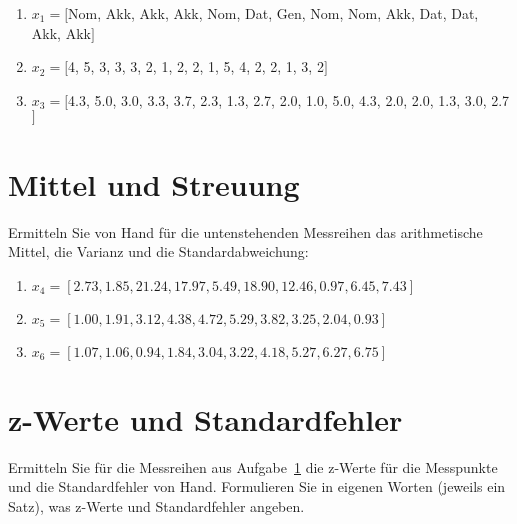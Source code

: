 \begin{enumerate}
  \item $x_1=[$Nom, Akk, Akk, Akk, Nom, Dat, Gen, Nom, Nom, Akk, Dat, Dat, Akk, Akk$]$
  \item $x_2=[$4, 5, 3, 3, 3, 2, 1, 2, 2, 1, 5, 4, 2, 2, 1, 3, 2$]$
  \item $x_3=[$4.3, 5.0, 3.0, 3.3, 3.7, 2.3, 1.3, 2.7, 2.0, 1.0, 5.0, 4.3, 2.0, 2.0, 1.3, 3.0, 2.7$]$
\end{enumerate}

\newpage

\section{Mittel und Streuung}
\label{sec:mittelstreu}

Ermitteln Sie von Hand für die untenstehenden Messreihen das arithmetische Mittel, die Varianz und die Standardabweichung:

\begin{enumerate}
  \item $x_4=[2.73, 1.85, 21.24, 17.97, 5.49, 18.90, 12.46, 0.97, 6.45, 7.43]$%
  \item $x_5=[1.00, 1.91, 3.12, 4.38, 4.72, 5.29, 3.82, 3.25, 2.04, 0.93]$%
  \item $x_6=[1.07, 1.06, 0.94, 1.84, 3.04, 3.22, 4.18, 5.27, 6.27, 6.75]$%
\end{enumerate}

\section{z-Werte und Standardfehler}

Ermitteln Sie für die Messreihen aus Aufgabe~\ref{sec:mittelstreu} die z-Werte für die Messpunkte und die Standardfehler von Hand.
Formulieren Sie in eigenen Worten (jeweils ein Satz), was z-Werte und Standardfehler angeben.

